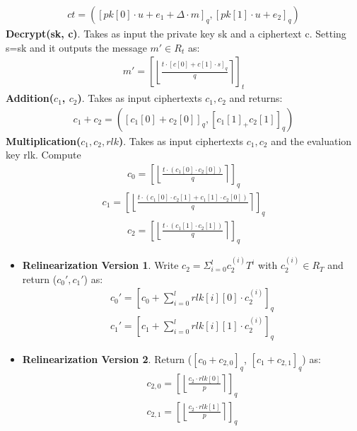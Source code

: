 \documentclass[A4paper,12pt]{article}
\begin{document}
	\begin{align*}
		ct = ([pk[0] \cdot u + e_1 + \Delta \cdot m]_q ,  [ pk[1] \cdot u + e_2]_q)
	\end{align*}	
\textbf{Decrypt(sk, c)}. Takes as input the private key sk and a ciphertext c. Setting s=sk and it outputs the message $m' \in R_t$ as:
	\begin{align*}
		m' = \left[ \left \lfloor \frac{t \cdot [c[0] + c[1] \cdot s]_q}{q} \right \rceil \right]_t
	\end{align*}
\textbf{Addition($c_1$, $c_2$)}. Takes as input ciphertexts $c_1, c_2$ and returns:
	\begin{align*}
		c_1 + c_2 = ([c_1[0] + c_2[0]]_q, [c_1[1] _+ c_2[1]]_q)
	\end{align*}
\textbf{Multiplication($c_1, c_2, rlk$)}. Takes as input ciphertexts $c_1, c_2$ and the evaluation key rlk. Compute
	\begin{align*}
		c_0 = \left [ \left \lfloor \frac{t \cdot (c_1[0] \cdot c_2[0])}{q} \right \rceil \right]_q    	
	\end{align*}
	\begin{align*}
		c_1 = \left [ \left \lfloor \frac{t \cdot (c_1[0] \cdot c_2[1] + c_1[1] \cdot c_2[0])}{q} \right \rceil \right]_q
	\end{align*}
	\begin{align*}
		c_2 = \left [ \left \lfloor \frac{t \cdot (c_1[1] \cdot c_2[1])}{q} \right \rceil \right]_q    	
	\end{align*}
	
	\begin{itemize}
		\item \textbf{Relinearization Version 1}. Write $c_2 = \Sigma_{i=0}^l c_2^{(i)}T^i$ with $c_2^{(i)} \in R_T$ and return ($c_0', c_1'$) as:
		\begin{align*}
			c_0' = \left [c_0 + \sum_{i=0}^{l}rlk[i][0] \cdot c_2^{(i)} \right]_q
		\end{align*} 
		\begin{align*}
			c_1' = \left [c_1 + \sum_{i=0}^{l}rlk[i][1] \cdot c_2^{(i)} \right]_q
		\end{align*}
		\item \textbf{Relinearization Version 2}. Return ($[c_0 + c_{2,0}]_q$, $[c_1 + c_{2,1}]_q$) as:
		\begin{align*}
		c_{2,0} = \left [ \left \lfloor \frac{c_2 \cdot rlk[0]}{p} \right \rceil \right]_q
		\end{align*} 
		\begin{align*}
		c_{2,1} = \left [ \left \lfloor \frac{c_2 \cdot rlk[1]}{p} \right \rceil \right]_q
		\end{align*}
	\end{itemize}
\end{document}
